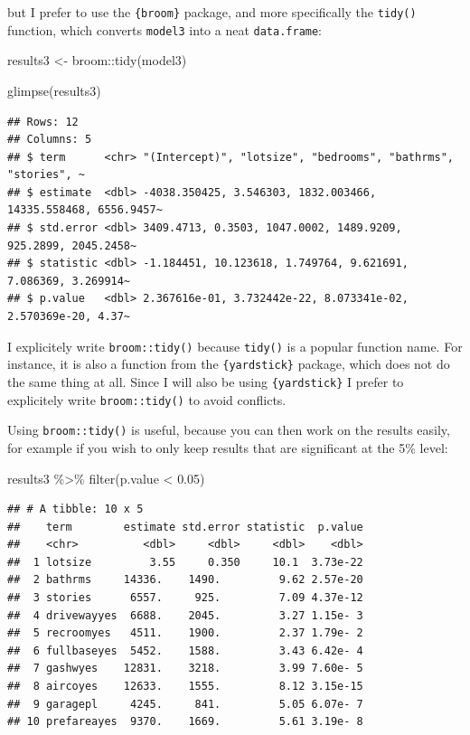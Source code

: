 \documentclass[
]{article}
\newenvironment{Shaded}{\begin{snugshade}}{\end{snugshade}}
\newcommand{\FloatTok}[1]{\textcolor[rgb]{0.00,0.00,0.81}{#1}}
\newcommand{\FunctionTok}[1]{\textcolor[rgb]{0.00,0.00,0.00}{#1}}
\newcommand{\NormalTok}[1]{#1}
\newcommand{\OtherTok}[1]{\textcolor[rgb]{0.56,0.35,0.01}{#1}}
\newcommand{\SpecialCharTok}[1]{\textcolor[rgb]{0.00,0.00,0.00}{#1}}
\begin{document}
but I prefer to use the \texttt{\{broom\}} package, and more specifically the \texttt{tidy()} function, which
converts \texttt{model3} into a neat \texttt{data.frame}:

\begin{Shaded}
\begin{Highlighting}[]
\NormalTok{results3 }\OtherTok{\textless{}{-}}\NormalTok{ broom}\SpecialCharTok{::}\FunctionTok{tidy}\NormalTok{(model3)}

\FunctionTok{glimpse}\NormalTok{(results3)}
\end{Highlighting}
\end{Shaded}

\begin{verbatim}
## Rows: 12
## Columns: 5
## $ term      <chr> "(Intercept)", "lotsize", "bedrooms", "bathrms", "stories", ~
## $ estimate  <dbl> -4038.350425, 3.546303, 1832.003466, 14335.558468, 6556.9457~
## $ std.error <dbl> 3409.4713, 0.3503, 1047.0002, 1489.9209, 925.2899, 2045.2458~
## $ statistic <dbl> -1.184451, 10.123618, 1.749764, 9.621691, 7.086369, 3.269914~
## $ p.value   <dbl> 2.367616e-01, 3.732442e-22, 8.073341e-02, 2.570369e-20, 4.37~
\end{verbatim}

I explicitely write \texttt{broom::tidy()} because \texttt{tidy()} is a popular function name. For instance,
it is also a function from the \texttt{\{yardstick\}} package, which does not do the same thing at all. Since
I will also be using \texttt{\{yardstick\}} I prefer to explicitely write \texttt{broom::tidy()} to avoid conflicts.

Using \texttt{broom::tidy()} is useful, because you can then work on the results easily, for example if
you wish to only keep results that are significant at the 5\% level:

\begin{Shaded}
\begin{Highlighting}[]
\NormalTok{results3 }\SpecialCharTok{\%\textgreater{}\%}
  \FunctionTok{filter}\NormalTok{(p.value }\SpecialCharTok{\textless{}} \FloatTok{0.05}\NormalTok{)}
\end{Highlighting}
\end{Shaded}

\begin{verbatim}
## # A tibble: 10 x 5
##    term        estimate std.error statistic  p.value
##    <chr>          <dbl>     <dbl>     <dbl>    <dbl>
##  1 lotsize         3.55     0.350     10.1  3.73e-22
##  2 bathrms     14336.    1490.         9.62 2.57e-20
##  3 stories      6557.     925.         7.09 4.37e-12
##  4 drivewayyes  6688.    2045.         3.27 1.15e- 3
##  5 recroomyes   4511.    1900.         2.37 1.79e- 2
##  6 fullbaseyes  5452.    1588.         3.43 6.42e- 4
##  7 gashwyes    12831.    3218.         3.99 7.60e- 5
##  8 aircoyes    12633.    1555.         8.12 3.15e-15
##  9 garagepl     4245.     841.         5.05 6.07e- 7
## 10 prefareayes  9370.    1669.         5.61 3.19e- 8
\end{verbatim}
\end{document}
